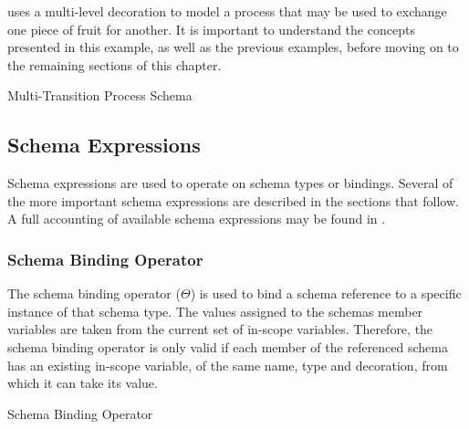 \documentclass[letterpaper,10pt,draft]{book}
\begin{document}
 uses a multi-level decoration to model a process that may
be used to exchange one piece of fruit for another.  It is important to understand
the concepts presented in this example, as well as the previous examples, before
moving on to the remaining sections of this chapter.

\begin{example}
\begin{minipage}[t]{0.49\linewidth}
   
\end{minipage}
\begin{minipage}[t]{0.49\linewidth}
   \azsch
   
\end{minipage}

   \caption{Multi-Transition Process Schema}
   \label{ex:SchemaProc2}
\end{example}

\subsection{Schema Expressions}
   \label{sect:SchExpr}

Schema expressions are used to operate on schema types or bindings.  Several of
the more important schema expressions are described in the sections that follow.
A full accounting of available schema expressions may be found in .

\subsubsection{Schema Binding Operator}
   \label{sect:SchBindOp}

The schema binding operator ($\Theta$) is used to bind a schema reference to a specific
instance of that schema type.  The values assigned to the schemas member variables
are taken from the current set of in-scope variables.  Therefore, the schema binding
operator is only valid if each member of the referenced schema has an existing in-scope
variable, of the same name, type and decoration, from which it can take its value.

\begin{example}
\begin{minipage}[t]{0.51\linewidth}
   
\end{minipage}
\begin{minipage}[t]{0.48\linewidth}
   \azsch
   
\end{minipage}

   \caption{Schema Binding Operator}
   \label{ex:SchBindOp}
\end{example}
\end{document}

